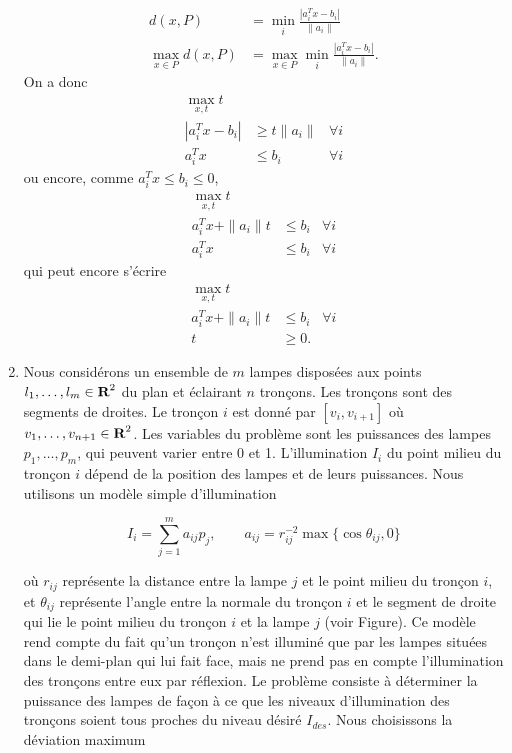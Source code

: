 \begin{enumerate}
    \label{ex:cheby_center}
    \begin{solution}
      \begin{align*}
        d(x, P) & = \min_i \frac{|a_i^Tx - b_i|}{\|a_i\|}\\
        \max_{x\in P} d(x, P)
        & = \max_{x\in P}\min_i \frac{|a_i^Tx - b_i|}{\|a_i\|}.
      \end{align*}
      On a donc
      \begin{align*}
        \max_{x, t} t\\
        |a_i^Tx - b_i| & \geq t\|a_i\| & \forall i\\
        a_i^Tx & \leq b_i & \forall i
      \end{align*}
      ou encore, comme $a_i^Tx \leq b_i \leq 0$,
      \begin{align*}
        \max_{x, t} t\\
        a_i^Tx + \|a_i\|t & \leq b_i & \forall i\\
        a_i^Tx & \leq b_i & \forall i
      \end{align*}
      qui peut encore s'écrire
      \begin{align*}
        \max_{x, t} t\\
        a_i^Tx + \|a_i\|t & \leq b_i & \forall i\\
        t & \geq 0.
      \end{align*}
    \end{solution}


  \item Nous considérons un ensemble de $m$ lampes disposées aux points $l_1, \ldots, l_m \in {\mbox{\bf R}}^2$ du plan et éclairant $n$
    tronçons. Les tronçons sont des segments de droites. Le tronçon $i$ est donné par $[v_i, v_{i+1}]$ où $v_1, \ldots, v_{n+1}
    \in {\mbox{\bf R}}^2$.  Les variables du problème sont les puissances des lampes $p_1, \ldots, p_m$, qui peuvent varier entre 0 et 1.
    L'illumination $I_i$ du point milieu du tronçon $i$ dépend de la position des lampes et de leurs
    puissances. Nous utilisons un modèle simple d'illumination

    $$I_i = \sum_{j=1}^m a_{ij} p_j, \qquad a_{ij}=r_{ij}^{-2} \max \{\cos \theta_{ij}, 0 \}$$

    où $r_{ij}$ représente la distance entre la lampe $j$ et le point milieu du tronçon $i$, et $\theta_{ij}$ représente l'angle
    entre la normale du tronçon $i$ et le segment de droite qui lie le point milieu du tronçon $i$ et la lampe $j$ (voir Figure). Ce
    modèle rend compte du fait qu'un tronçon n'est illuminé que par les lampes situées dans le demi-plan qui lui fait face,
    mais ne prend pas en compte l'illumination des tronçons entre eux par réflexion.  Le problème consiste à déterminer la puissance des lampes de façon à ce
    que les niveaux d'illumination des  tronçons soient tous proches du niveau désiré $I_{des}$. Nous choisissons la déviation maximum


\end{enumerate}
